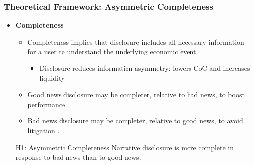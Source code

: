 \documentclass{beamer}
\begin{document}
\begin{frame}
	\frametitle{Theoretical Framework: Asymmetric Completeness}
	\begin{itemize}
\item \textbf{Completeness}

\begin{itemize}
	\item Completeness implies that disclosure includes all necessary information for a user to understand the underlying economic event.
		\begin{itemize}
		\item Disclosure reduces information asymmetry: lowers CoC and increases liquidity \cite{diamondDisclosureLiquidityCost1991,diamondOptimalReleaseInformation1985,leuzEconomicConsequencesIncreased2000}
	\end{itemize}
	
	\item Good news disclosure may be completer, relative to bad news, to boost performance \citep{teohEarningsManagementUnderperformance1998, langVoluntaryDisclosureEquity2000}.
	\item Bad news disclosure may be completer, relative to good news, to avoid litigation \citep{skinnerWhyFirmsVoluntarily1994, skinnerEarningsDisclosuresStockholder1997}.
\end{itemize}

\medskip
\pause
\begin{block}{H1: Asymmetric Completeness}
	Narrative disclosure is more complete in response to bad news than to good news.
\end{block}


\end{itemize}
\end{frame}
\end{document}
